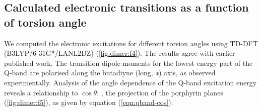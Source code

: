 	\subsection{Calculated electronic transitions as a function of torsion angle}

		We computed the electronic excitations for different torsion angles using TD-DFT (B3LYP/6-31G*/LANL2DZ) (\autoref{fig:dimer:f4}). The results agree with earlier published work.\autocite{Winters2007} The transition dipole moments for the lowest energy part of the Q-band are polarised along the butadiyne (long, \textit{x}) axis, as observed experimentally.\autocite{Anderson1994a,Drobizhev2005} Analysis of the angle dependence of the Q-band excitation energy reveals a relationship to $\cos \theta$: , the projection of the porphyrin planes (\autoref{fig:dimer:f5}), as given by equation (\ref{eqn:qband-cos}):

